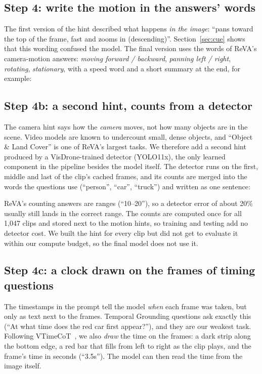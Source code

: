 \subsection{Step 4: write the motion in the answers' words}
The first version of the hint described what happens \emph{in the image}:
``pans toward the top of the frame, fast and zooms in (descending)''.
Section~\ref{sec:cue} shows that this wording confused the model. The final
version uses the words of ReVA's camera-motion answers: \emph{moving
forward / backward}, \emph{panning left / right}, \emph{rotating},
\emph{stationary}, with a speed word and a short summary at the end, for
example:

\smallskip
\noindent{}
\smallskip

\subsection{Step 4b: a second hint, counts from a detector}
\label{sec:counts}
The camera hint says how the \emph{camera} moves, not how many objects are
in the scene. Video models are known to undercount small, dense objects, and
``Object \& Land Cover'' is one of ReVA's largest tasks. We therefore add a
second hint produced by a VisDrone-trained detector (YOLO11x), the only
learned component in the pipeline besides the model itself. The detector
runs on the first, middle and last of the clip's cached frames, and its
counts are merged into the words the questions use (``person'', ``car'',
``truck'') and written as one sentence:

\smallskip
\noindent{}
\smallskip

ReVA's counting answers are ranges (``10--20''), so a detector error of
about 20\% usually still lands in the correct range. The counts are
computed once for all 1,047 clips and stored next to the motion hints, so
training and testing add no detector cost. We built the hint for every
clip but did not get to evaluate it within our compute budget, so the
final model does not use it.

\subsection{Step 4c: a clock drawn on the frames of timing questions}
\label{sec:timebar}
The timestamps in the prompt tell the model \emph{when} each frame was
taken, but only as text next to the frames. Temporal Grounding questions ask
exactly this (``At what time does the red car first appear?''), and they
are our weakest task. Following VTimeCoT~\cite{zhang2025vtimecot}, we also
\emph{draw} the time on the frames: a dark strip along the bottom edge, a
red bar that fills from left to right as the clip plays, and the frame's
time in seconds (``3.5s''). The model can then read the time from the image
itself.

